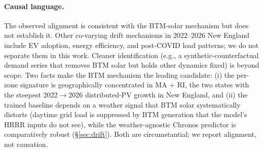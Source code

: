 \paragraph{Causal language.} The observed alignment is consistent with
the BTM-solar mechanism but does not establish it. Other co-varying
drift mechanisms in 2022--2026 New England include EV adoption, energy
efficiency, and post-COVID load patterns; we do not separate them in
this work. Cleaner identification (e.g., a synthetic-counterfactual
demand series that removes BTM solar but holds other dynamics fixed) is
beyond scope. Two facts make the BTM mechanism the leading candidate:
(i) the per-zone signature is geographically concentrated in MA + RI,
the two states with the steepest 2022$\to$2026 distributed-PV growth in
New England, and (ii) the trained baseline depends on a weather signal
that BTM solar systematically distorts (daytime grid load is suppressed
by BTM generation that the model's HRRR inputs do not see), while the
weather-agnostic Chronos predictor is comparatively robust
(§\ref{sec:drift}). Both are circumstantial; we report alignment, not
causation.
